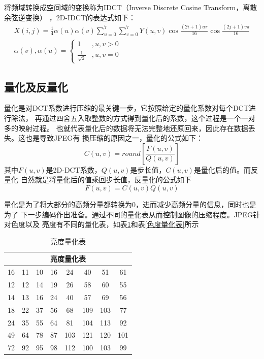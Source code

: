 \documentclass{article}
\numberwithin {equation}{section}
\begin{document}
\begin{spacing}{1.25}
    将频域转换成空间域的变换称为IDCT（Inverse Discrete Cosine Transform，离散余弦逆变换）
    ，2D-IDCT的表达式如下：
    \begin{equation}
      \begin{gathered}
        X(i,j)=\frac{1}{4}\alpha(u)\alpha(v)\sum_{u=0}^{7}\sum_{v=0}^{7}
        Y(u,v)\cos\frac{(2i+1)u\pi}{16}\cos\frac{(2j+1)v\pi}{16}\\
          \alpha (v),\alpha (u) = \begin{cases}
            1 &,u,v>0\\
            \frac{1}{\sqrt{2}} &,u,v=0
          \end{cases}
      \end{gathered}
    \end{equation}
  \subsection{量化及反量化}
    \vspace{1em}
    量化是对DCT系数进行压缩的最关键一步，它按照给定的量化系数对每个DCT进行除法，
    再通过四舍五入取整数的方式得到量化后的系数，这个过程是一个一对多的映射过程。
    也就代表量化后的数据将无法完整地还原回来，因此存在数据丢失。这也是导致JPEG有
    损压缩的原因之一，量化的公式如下：
    \begin{equation}
      C(u,v)=round\left[\frac{F(u,v)}{Q(u,v)}\right]
    \end{equation}
    其中$F(u,v)$是2D-DCT系数，$Q(u,v)$是步长值，$C(u,v)$是量化后的值。而反量化
    自然就是将量化后的值乘回步长值，反量化的公式如下
    \begin{equation}
      F(u,v)=C(u,v)Q(u,v)
    \end{equation}

    量化是为了将大部分的高频分量都转换为0，进而减少高频分量的信息，同时也是为了
    下一步编码作出准备。通过不同的量化表从而控制图像的压缩程度。JPEG针对色度以及
    亮度有不同的量化表，如表\ref{亮度量化表}和表\ref{色度量化表}所示

    \begin{table}[H]
      \caption{亮度量化表}
      \label{亮度量化表}
      \centering
      \begin{tabular}{cccccccc}
        \toprule
        \multicolumn{8}{c}{亮度量化表}\\
        \midrule
        16 & 11 & 10 & 16 & 24 & 40 & 51 & 61 \\
        12 & 12 & 14 & 19 & 26 & 58 & 60 & 55 \\
        14 & 13 & 16 & 24 & 40 & 57 & 69 & 56 \\
        18 & 22 & 37 & 56 & 68 & 109 & 103 & 77 \\
        24 & 35 & 55 & 64 & 81 & 104 & 113 & 92 \\
        49 & 64 & 78 & 87 & 103 & 121 & 120 & 101 \\
        72 & 92 & 95 & 98 & 112 & 100 & 103 & 99 \\
        \bottomrule
      \end{tabular}
    \end{table}


\end{spacing}
\end{document}
